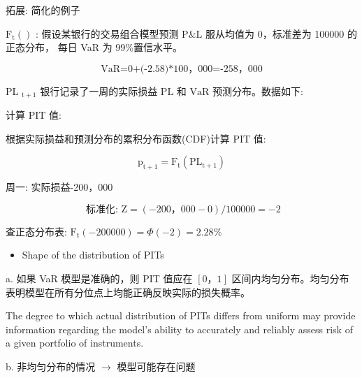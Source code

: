 拓展: 简化的例子

\({\mathrm{F}}_{\mathrm{t}}\left( \right)\) : 假设某银行的交易组合模型预测 \(\mathrm{P}\& \mathrm{L}\) 服从均值为 0，标准差为 100000 的正态分布， 每日 VaR 为 99\%置信水平。

\[
\text{ VaR=0+(-2.58)*100，000=-258，000 }
\]

PL \({}_{\mathrm{t} + 1}\) 银行记录了一周的实际损益 \(\mathrm{{PL}}\) 和 \(\mathrm{{VaR}}\) 预测分布。数据如下:

\begin{center}
\end{center}

计算 PIT 值:

根据实际损益和预测分布的累积分布函数(CDF)计算 PIT 值:

\[
{\mathrm{p}}_{\mathrm{t} + 1} = {\mathrm{F}}_{\mathrm{t}}\left( {\mathrm{{PL}}}_{\mathrm{t} + 1}\right)
\]

周一: 实际损益-200，000

\[
\text{ 标准化: }\mathrm{Z} = \left( {-{200}，{000} - 0}\right) /{100000} =  - 2
\]

查正态分布表: \({\mathrm{F}}_{\mathrm{t}}\left( {-{200000}}\right)  = \Phi \left( {-2}\right)  = {2.28}\%\)

\begin{itemize}
\item Shape of the distribution of PITs
\end{itemize}

a. 如果 VaR 模型是准确的，则 PIT 值应在 \(\left\lbrack  {0，1}\right\rbrack\) 区间内均匀分布。均匀分布表明模型在所有分位点上均能正确反映实际的损失概率。

 The degree to which actual distribution of PITs differs from uniform may provide information regarding the model's ability to accurately and reliably assess risk of a given portfolio of instruments.

b. 非均匀分布的情况 \(\rightarrow\) 模型可能存在问题

